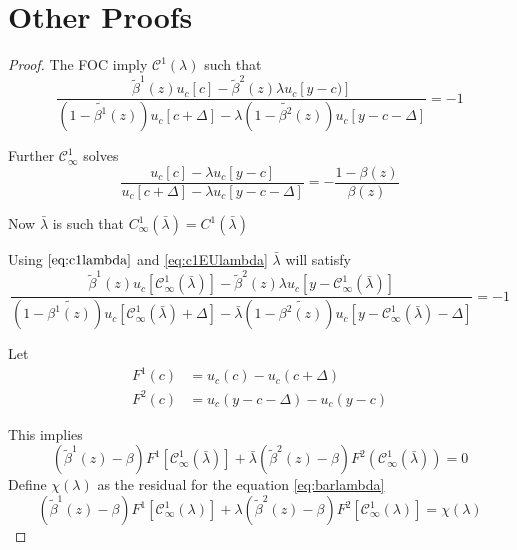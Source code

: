 \documentclass[12pt]{article}
\begin{document}
\section{Other Proofs}






\begin{proof}
The FOC imply $\mathcal{C}^1(\lambda)$ such that
\begin{equation}
\frac{\tilde{\beta}^1(z)u_{c}[c]-\tilde{\beta}^2(z)\lambda u_{c}[y-c)]}{ (1-\tilde{\beta^1}(z))u_{c}[c+\Delta]-\lambda (1-\tilde{\beta^2}(z))u_{c}[y-c-\Delta]}=-1
\label{eq:c1lambda}
\end{equation}

Further $\mathcal{C}^1_{\infty}$ solves
\begin{equation}
\frac{u_{c}[c]-\lambda u_{c}[y-c]}{ u_{c}[c+\Delta]-\lambda u_{c}[y-c-\Delta]}=-\frac{1-\beta(z)}{\beta(z)}
\label{eq:c1EUlambda}
\end{equation}

Now $\bar{\lambda}$ is such that $C^{1}_{\infty}(\bar{\lambda})=C^{1}(\bar{\lambda})$

Using $\ref{eq:c1lambda}$ and \ref{eq:c1EUlambda} $\bar{\lambda}$ will satisfy
\begin{equation}
\frac{\tilde{\beta}^1(z)u_{c}[\mathcal{C}^1_{\infty}(\bar{\lambda})]-\tilde{\beta}^2(z)\lambda u_{c}[y-\mathcal{C}^1_{\infty}(\bar{\lambda})]}{ (1-\tilde{\beta^1(z)})u_{c}[\mathcal{C}^1_{\infty}(\bar{\lambda})+\Delta]-\bar{\lambda} (1-\tilde{\beta^2(z)})u_{c}[y-\mathcal{C}^1_{\infty}(\bar{\lambda})-\Delta]}=-1
\end{equation}


Let 
\begin{align}
F^1(c)&=u_c(c)-u_c(c+\Delta)\\
F^2(c)&=u_c(y-c-\Delta)-u_c(y-c)
\end{align}

This implies
\begin{equation}
(\tilde{\beta}^1(z)-\beta) F^1[\mathcal{C}^1_{\infty}(\bar{\lambda})]+\bar{\lambda}(\tilde{\beta}^2(z)-\beta)F^2(\mathcal{C}^1_{\infty}(\bar{\lambda}))=0
\label{eq:barlambda}
\end{equation}
Define $\chi(\lambda)$ as the residual for the equation \ref{eq:barlambda}
\begin{equation}
(\tilde{\beta}^1(z)-\beta) F^1[\mathcal{C}^1_{\infty}(\lambda)]+\lambda(\tilde{\beta}^2(z)-\beta)F^2[\mathcal{C}^1_{\infty}(\lambda)]=\chi(\lambda)
\end{equation}



\end{proof}
\end{document}
